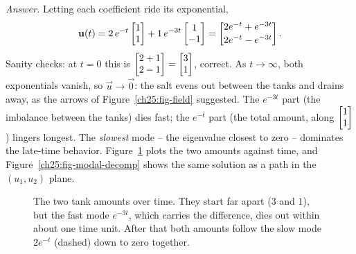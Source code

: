 \emph{Answer.} Letting each coefficient ride its exponential,
\[
  \mathbf{u}(t)
  = 2\,e^{-t}\begin{bmatrix}1\\1\end{bmatrix} + 1\,e^{-3t}\begin{bmatrix}1\\-1\end{bmatrix}
  = \begin{bmatrix}2e^{-t} + e^{-3t}\\[2pt] 2e^{-t} - e^{-3t}\end{bmatrix}.
\]
Sanity checks: at $t=0$ this is $\begin{bmatrix}2+1\\2-1\end{bmatrix}=\begin{bmatrix}3\\1\end{bmatrix}$, correct. As
$t\to\infty$, both exponentials vanish, so $\vec{u}\to\vec{0}$: the salt
evens out between the tanks and drains away, as the arrows of
Figure~\ref{ch25:fig-field} suggested. The
$e^{-3t}$ part (the imbalance between the tanks) dies fast; the $e^{-t}$ part (the
total amount, along $\begin{bmatrix}1\\1\end{bmatrix}$) lingers longest. The \emph{slowest} mode --
the eigenvalue closest to zero -- dominates the late-time behavior.
Figure~\ref{ch25:fig-tank-time} plots the two amounts against time, and
Figure~\ref{ch25:fig-modal-decomp} shows the same solution as a path in the
$(u_1,u_2)$ plane.

\begin{figure}[htbp]
\centering
{}
\caption{The two tank amounts over time. They start far apart ($3$ and $1$),
but the fast mode $e^{-3t}$, which carries the difference, dies out within
about one time unit. After that both amounts follow the slow mode $2e^{-t}$
(dashed) down to zero together.}
\label{ch25:fig-tank-time}
\end{figure}

